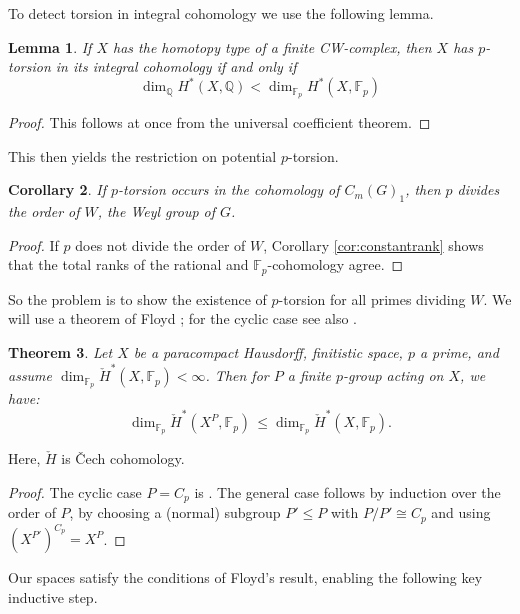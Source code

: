 \documentclass[oneside, 12pt, a4paper]{amsart}
\numberwithin{equation}{section}
\newcommand{\F}{\mathbb{F}}
\theoremstyle{plain}
\newtheorem{theorem}{Theorem}[section]
\newtheorem{lemma}[theorem]{Lemma}
\newtheorem{corollary}[theorem]{Corollary}
\theoremstyle{definition}
\theoremstyle{remark}
\begin{document}
To detect torsion in integral cohomology we use the following lemma.

\begin{lemma} \label{lem:recognition}
If $X$ has the homotopy type of a finite CW-complex, then $X$ has $p$-torsion in its integral cohomology if and only if \[\dim_{\mathbb{Q}}H^*(X,\mathbb{Q})< \dim_{\mathbb{F}_p}H^*(X,\mathbb{F}_p)\]
\end{lemma}
\begin{proof}
This follows at once from the universal coefficient theorem.
\end{proof}

This then yields the restriction on potential $p$-torsion.

\begin{corollary} \label{cor:modular}
If $p$-torsion occurs in the cohomology of $C_m(G)_1$, then $p$ divides the order of $W$, the Weyl group of $G$.
\end{corollary}

\begin{proof}
If $p$ does not divide the order of $W$, Corollary \ref{cor:constantrank} shows that the total ranks of the rational and $\mathbb{F}_p$-cohomology agree.
\end{proof}

So the problem is to show the existence of $p$-torsion for all primes dividing $W$. We will use a theorem of Floyd \cite[Theorem 4.4]{Floyd}; for the cyclic case see also \cite[Theorem 3.10.4]{AlldayPuppe}.
\begin{theorem}\label{thm:floyd}
Let $X$ be a paracompact Hausdorff, finitistic space, $p$ a prime, and assume $\dim_{\F_p}\check{H}^\ast(X,\F_p) < \infty$. Then for $P$ a finite $p$-group acting on $X$, we have:
\[
\dim_{\F_p} \check{H}^\ast(X^P,\F_p)\, \leq \dim_{\F_p} \check{H}^\ast(X,\F_p). 
\]
\end{theorem}

Here, $\check{H}$ is \v{C}ech cohomology.

\begin{proof}
The cyclic case $P=C_p$ is \cite[Theorem 3.10.4]{AlldayPuppe}. The general case follows by induction over the order of $P$, by choosing a (normal) subgroup $P'\leq P$ with $P/P'\cong C_p$ and using $(X^{P'})^{C_p}= X^P$.
\end{proof}

Our spaces satisfy the conditions of Floyd's result, enabling the following key inductive step.
\end{document}
